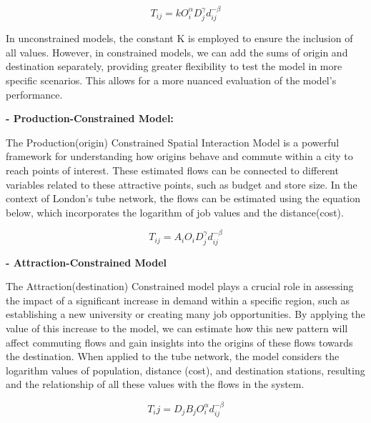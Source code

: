 \documentclass[10pt]{report}
\numberwithin{figure}{section}
\numberwithin{table}{section}
\begin{document}
\begin{equation} \tag{1}
T_{ij} = k O_i^\alpha  D_j^\gamma  d_{ij}^{-\beta}
\end{equation}

\vspace{5mm} %

In unconstrained models, the constant K is employed to ensure the inclusion of all values. However, in constrained models, we can add the sums of origin and destination separately, providing greater flexibility to test the model in more specific scenarios. This allows for a more nuanced evaluation of the model's performance.

\vspace{5mm} %

\textbf{- Production-Constrained Model:}

The Production(origin) Constrained Spatial Interaction Model is a powerful framework for understanding how origins behave and commute within a city to reach points of interest. These estimated flows can be connected to different variables related to these attractive points, such as budget and store size. In the context of London's tube network, the flows can be estimated using the equation below, which incorporates the logarithm of job values and the distance(cost).

\begin{equation} \label{eq:1} \tag{2}
T_{ij} = A_i O_i D_j^\gamma d_{ij}^{-\beta}
\end{equation}

\vspace{5mm} %

\textbf{- Attraction-Constrained Model}

The Attraction(destination) Constrained model plays a crucial role in assessing the impact of a significant increase in demand within a specific region, such as establishing a new university or creating many job opportunities. By applying the value of this increase to the model, we can estimate how this new pattern will affect commuting flows and gain insights into the origins of these flows towards the destination. When applied to the tube network, the model considers the logarithm values of population, distance (cost), and destination stations,  resulting and the relationship of all these values with the flows in the system.


\begin{equation} \label{eq:5} \tag{3}
T_ij = D_j B_j O_i^\alpha d_{ij}^{-\beta}
\end{equation}
\end{document}
